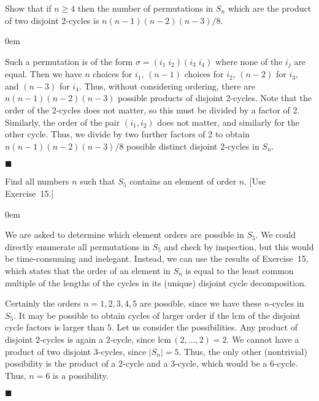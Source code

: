 \documentclass[12pt]{article}
\renewcommand{\qed}{\hfill$\blacksquare$}
\renewenvironment{proof}{\begin{addmargin}[1em]{0em}\begin{newproof}}{\end{newproof}\end{addmargin}\qed}
\newenvironment{problem}[2][Exercise]{\begin{trivlist}
\item[\hskip \labelsep {\bfseries #1}\hskip \labelsep {\bfseries #2.}]}{\end{trivlist}}
\begin{document}
\begin{problem}{1.3.17}
  Show that if $n\geq 4$ then the number of permutations in $S_n$ which are the product of two disjoint $2$-cycles is $n\left(n-1\right)\left(n-2\right)\left(n-3\right)/8$.
\end{problem}
\begin{proof}
Such a permutation is of the form $\sigma = \left(i_1\;i_2\right)\left(i_3\;i_4\right)$ where none of the $i_j$ are equal. Then we have $n$ choices for $i_1$, $\left(n-1\right)$ choices for $i_2$, $\left(n-2\right)$ for $i_3$, and $\left(n-3\right)$ for $i_4$. Thus, without considering ordering, there are $ n\left(n-1\right)\left(n-2\right) \left(n-3 \right)$ possible products of disjoint 2-cycles. Note that the order of the 2-cycles does not matter, so this must be divided by a factor of 2. Similarly, the order of the pair $\left(i_1,i_2\right)$ does not matter, and similarly for the other cycle. Thus, we divide by two further factors of 2 to obtain $n\left(n-1\right)\left(n-2\right)\left(n-3\right)/8$ possible distinct disjoint 2-cycles in $S_n$.
\end{proof}


\begin{problem}{1.3.18}
Find all numbers $n$ such that $S_5$ contains an element of order $n$. [Use Exercise~15.]
\end{problem}
\begin{proof}
We are asked to determine which element orders are possible in $S_5$. We could directly enumerate all permutations in $S_5$ and check by inspection, but this would be time-consuming and inelegant. Instead, we can use the results of Exercise~15, which states that the order of an element in $S_n$ is equal to the least common multiple of the lengths of the cycles in its (unique) disjoint cycle decomposition.

Certainly the orders $n=1,2,3,4,5$ are possible, since we have these $n$-cycles in $S_5$. It may be possible to obtain cycles of larger order if the $\text{lcm}$ of the disjoint cycle factors is larger than $5$. Let us consider the possibilities. Any product of disjoint $2$-cycles is again a $2$-cycle, since $\text{lcm}\,\left(2,\ldots,2\right)=2$. We cannot have a product of two disjoint $3$-cycles, since $\left|S_n\right|=5$. Thus, the only other (nontrivial) possibility is the product of a $2$-cycle and a $3$-cycle, which would be a $6$-cycle. Thus, $n=6$ is a possibility.
\end{proof}
\end{document}
